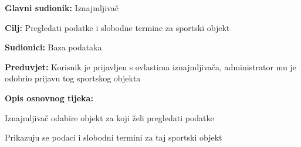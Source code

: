 				
				
					\noindent {}
					\begin{packed_item}
						
						\item \textbf{Glavni sudionik: } Iznajmljivač
						\item  \textbf{Cilj:}  Pregledati podatke i slobodne termine za sportski objekt
						\item  \textbf{Sudionici:} Baza podataka
						\item  \textbf{Preduvjet:} Korisnik je prijavljen s ovlastima iznajmljivača, administrator mu je odobrio prijavu tog sportskog objekta
						\item  \textbf{Opis osnovnog tijeka:}
						
						\item[] \begin{packed_enum}
							
							\item Iznajmljivač odabire objekt za koji želi pregledati podatke
							\item Prikazuju se podaci i slobodni termini za taj sportski objekt
							
						\end{packed_enum}
						
					\end{packed_item}
					
